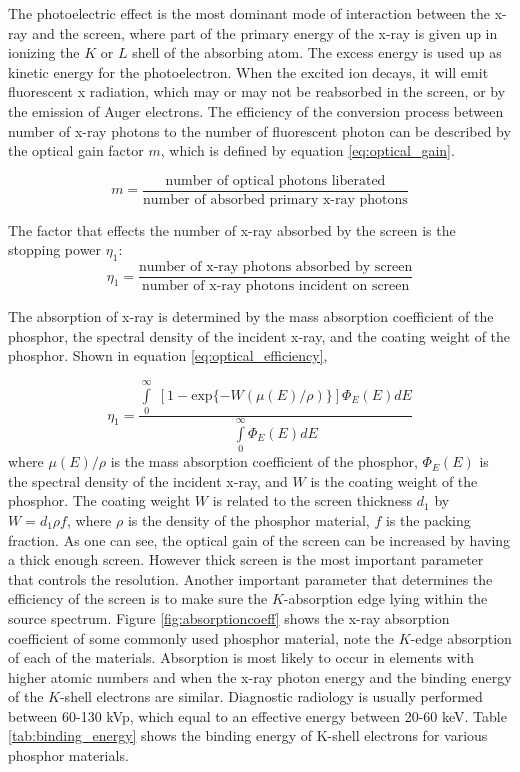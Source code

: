 The photoelectric effect is the most dominant mode of interaction between the x-ray and the screen, where part of the primary energy of the x-ray is given up in ionizing the $K$ or $L$ shell of the absorbing atom.  The excess energy is used up as kinetic energy for the photoelectron.  When the excited ion decays, it will emit fluorescent x radiation, which may or may not be reabsorbed in the screen, or by the emission of Auger electrons.  The efficiency of the conversion process between number of x-ray photons to the number of fluorescent photon can be described by the optical gain factor $m$, which is defined by equation \ref{eq:optical_gain}.

\begin{equation}
m = \frac{\textrm{number of optical photons liberated}}{\textrm{number of absorbed primary x-ray photons}}
\label{eq:optical_gain}
\end{equation}

The factor that effects the number of x-ray absorbed by the screen is the stopping power $\eta_1$:
\begin{equation}
\eta_1 = \frac{\textrm{number of x-ray photons absorbed by screen}}{\textrm{number of x-ray photons incident on screen}}
\label{eq:stopping_power}
\end{equation}

The absorption of x-ray is determined by the mass absorption coefficient of the phosphor, the spectral density of the incident x-ray, and the coating weight of the phosphor.  Shown in equation \ref{eq:optical_efficiency},

\begin{equation}
\eta_1 = \frac{\int\limits_0^\infty \; \left[ 1 - \textrm{exp} \{ -W(\mu(E) / \rho ) \} \right] \Phi_E (E) dE }{\int\limits_0^\infty \Phi_E(E) dE}
\label{eq:optical_efficiency}
\end{equation}
where $\mu(E)/\rho$ is the mass absorption coefficient of the phosphor, $\Phi_E(E)$ is the spectral density of the incident x-ray, and $W$ is the coating weight of the phosphor.  The coating weight $W$ is related to the screen thickness $d_1$ by $W = d_1 \rho f$, where $\rho$ is the density of the phosphor material, $f$ is the packing fraction.  As one can see, the optical gain of the screen can be increased by having a thick enough screen.  However thick screen is the most important parameter that controls the resolution.  Another important parameter that determines the efficiency of the screen is to make sure the $K$-absorption edge lying within the source spectrum.  Figure \ref{fig:absorptioncoeff} shows the x-ray absorption coefficient of some commonly used phosphor material, note the $K$-edge absorption of each of the materials.  Absorption is most likely to occur in elements with higher atomic numbers and when the x-ray photon energy and the binding energy of the $K$-shell electrons are similar.  Diagnostic radiology is usually performed between 60-130 kVp, which equal to an effective energy between 20-60 keV.  Table \ref{tab:binding_energy} shows the binding energy of K-shell electrons for various phosphor materials.

